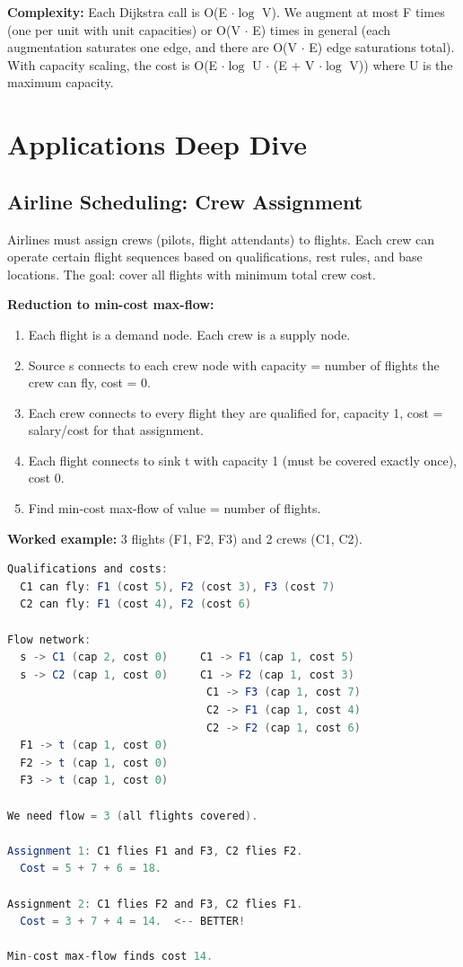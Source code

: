 \textbf{Complexity:} Each Dijkstra call is O(E $\cdot \log$ V). We augment at most F times (one per unit with unit capacities) or O(V $\cdot$ E) times in general (each augmentation saturates one edge, and there are O(V $\cdot$ E) edge saturations total). With capacity scaling, the cost is O(E $\cdot \log$ U $\cdot$ (E + V $\cdot \log$ V)) where U is the maximum capacity.

\section{Applications Deep Dive}

\subsection{Airline Scheduling: Crew Assignment}

Airlines must assign crews (pilots, flight attendants) to flights. Each crew can operate certain flight sequences based on qualifications, rest rules, and base locations. The goal: cover all flights with minimum total crew cost.

\textbf{Reduction to min-cost max-flow:}
\begin{enumerate}
\item Each flight is a demand node. Each crew is a supply node.
\item Source s connects to each crew node with capacity = number of flights the crew can fly, cost = 0.
\item Each crew connects to every flight they are qualified for, capacity 1, cost = salary/cost for that assignment.
\item Each flight connects to sink t with capacity 1 (must be covered exactly once), cost 0.
\item Find min-cost max-flow of value = number of flights.
\end{enumerate}

\textbf{Worked example:} 3 flights (F1, F2, F3) and 2 crews (C1, C2).

\begin{lstlisting}[language=Java]
Qualifications and costs:
  C1 can fly: F1 (cost 5), F2 (cost 3), F3 (cost 7)
  C2 can fly: F1 (cost 4), F2 (cost 6)

Flow network:
  s -> C1 (cap 2, cost 0)     C1 -> F1 (cap 1, cost 5)
  s -> C2 (cap 1, cost 0)     C1 -> F2 (cap 1, cost 3)
                               C1 -> F3 (cap 1, cost 7)
                               C2 -> F1 (cap 1, cost 4)
                               C2 -> F2 (cap 1, cost 6)
  F1 -> t (cap 1, cost 0)
  F2 -> t (cap 1, cost 0)
  F3 -> t (cap 1, cost 0)

We need flow = 3 (all flights covered).

Assignment 1: C1 flies F1 and F3, C2 flies F2.
  Cost = 5 + 7 + 6 = 18.

Assignment 2: C1 flies F2 and F3, C2 flies F1.
  Cost = 3 + 7 + 4 = 14.  <-- BETTER!

Min-cost max-flow finds cost 14.
\end{lstlisting}

